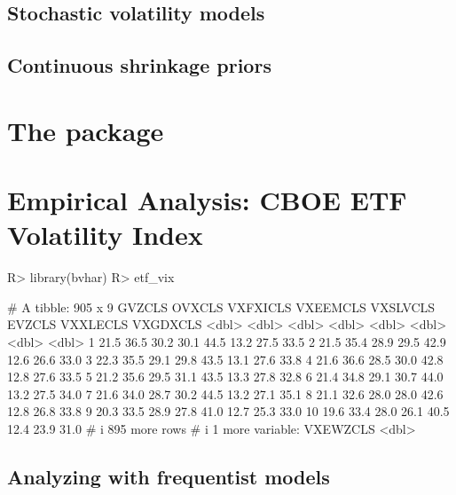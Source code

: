 \documentclass[
]{jss}
\begin{document}
\subsection[sv]{Stochastic volatility models}\label{sec:sv}

\subsection[shrinkage]{Continuous shrinkage priors}\label{sec:shrinkage}

\section[package]{The  package}\label{sec:bvharpkg}

\section[example]{Empirical Analysis: CBOE ETF Volatility
Index}\label{sec:analysis}

\begin{CodeChunk}
\begin{CodeInput}
R> library(bvhar)
R> etf_vix
\end{CodeInput}
\begin{CodeOutput}
# A tibble: 905 x 9
   GVZCLS OVXCLS VXFXICLS VXEEMCLS VXSLVCLS EVZCLS VXXLECLS VXGDXCLS
    <dbl>  <dbl>    <dbl>    <dbl>    <dbl>  <dbl>    <dbl>    <dbl>
 1   21.5   36.5     30.2     30.1     44.5   13.2     27.5     33.5
 2   21.5   35.4     28.9     29.5     42.9   12.6     26.6     33.0
 3   22.3   35.5     29.1     29.8     43.5   13.1     27.6     33.8
 4   21.6   36.6     28.5     30.0     42.8   12.8     27.6     33.5
 5   21.2   35.6     29.5     31.1     43.5   13.3     27.8     32.8
 6   21.4   34.8     29.1     30.7     44.0   13.2     27.5     34.0
 7   21.6   34.0     28.7     30.2     44.5   13.2     27.1     35.1
 8   21.1   32.6     28.0     28.0     42.6   12.8     26.8     33.8
 9   20.3   33.5     28.9     27.8     41.0   12.7     25.3     33.0
10   19.6   33.4     28.0     26.1     40.5   12.4     23.9     31.0
# i 895 more rows
# i 1 more variable: VXEWZCLS <dbl>
\end{CodeOutput}
\end{CodeChunk}

\subsection{Analyzing with frequentist
models}\label{analyzing-with-frequentist-models}
\end{document}
